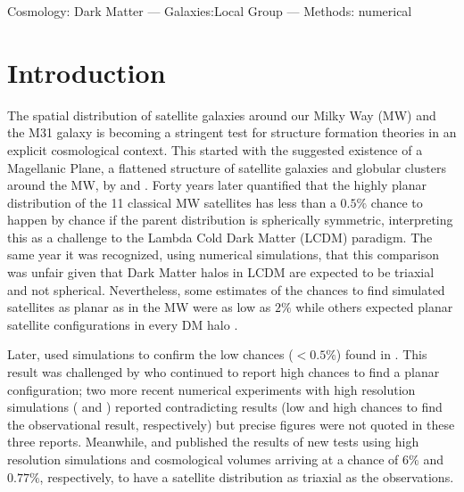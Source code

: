 \documentclass[a4paper,fleqn,usenatbib]{mnras}
\begin{document}
\begin{keywords}Cosmology: Dark Matter --- Galaxies:Local Group ---
  Methods: numerical  
\end{keywords}

\section{Introduction}

The spatial distribution of satellite galaxies around our Milky Way
(MW) and the M31 galaxy is becoming a stringent test for structure
formation theories in an explicit cosmological context. 
This started with the suggested existence of a Magellanic Plane, a flattened
structure of satellite galaxies and globular clusters around the MW,
by \cite{1976RGOB..182..241K} and \cite{1976MNRAS.174..695L}.  
Forty years later \cite{2005A&A...431..517K} quantified that the
highly planar distribution of the 11 classical MW satellites has less
than a $0.5\%$ chance to happen by chance if the
parent distribution is spherically symmetric, interpreting this as a
challenge to the Lambda Cold Dark Matter (LCDM) paradigm.
The same year it was recognized, using numerical simulations, that
this comparison was unfair given that Dark Matter halos in LCDM
are expected to be triaxial and not spherical.
Nevertheless, some estimates of the chances to find simulated satellites as
planar as in the MW 
were as low as $2\%$ \citep{2005ApJ...629..219Z} while others expected
planar satellite configurations in every DM halo
\citep{2005MNRAS.363..146L}.

Later, \cite{2007MNRAS.374.1125M} used simulations to confirm the low
chances ($<0.5\%$) found in \cite{2005A&A...431..517K}.
This result was challenged by \cite{2009MNRAS.399..550L} who continued
to report high chances to find a planar configuration;
two more recent numerical experiments with high resolution simulations
(\cite{2013MNRAS.429..725S} and \cite{2016MNRAS.457.1931S}) reported
contradicting results (low and high chances to find the observational
result, respectively) but precise figures were not quoted in these three reports. 
Meanwhile, \cite{2013MNRAS.429.1502W} and \cite{2014ApJ...789L..24P} published
the results of new tests using high resolution simulations and cosmological
volumes arriving at a chance of $6\%$ and $0.77\%$, respectively, to
have a satellite distribution as triaxial as the observations. 
\end{document}

